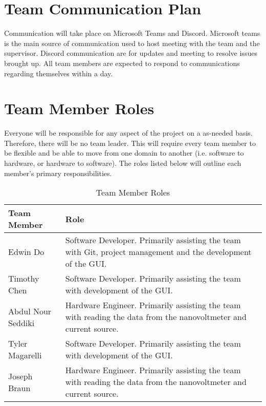 \documentclass{article}
\begin{document}
\section{Team Communication Plan}
Communication will take place on Microsoft Teams and Discord. 
Microsoft teams is the main source of communication used to host meeting with the team and the supervisor. 
Discord communication are for updates and meeting to resolve issues brought up. 
All team members are expected to respond to communications regarding themselves within a day.

\section{Team Member Roles}
\indent Everyone will be responsible for any aspect of the project on a as-needed basis. Therefore, there will be no team leader.
This will require every team member to be flexible and be able to move from one domain to another (i.e. software to hardware, or hardware to software).
The roles listed below will outline each member's primary responsibilities.
\begin{table}[h!]
    \centering

	
    \begin{tabular}{p{} p{}}

    \toprule
    \textbf{Team Member} & \textbf{Role}\\

    \midrule{Edwin Do} & Software Developer. Primarily assisting the team with Git, project management and the development of the GUI. \\
    \midrule{Timothy Chen} & Software Developer. Primarily assisting the team with development of the GUI. \\
    \midrule{Abdul Nour Seddiki} & Hardware Engineer. Primarily assisting the team with reading the data from the nanovoltmeter and current source. \\
    \midrule{Tyler Magarelli} & Software Developer. Primarily assisting the team with development of the GUI. \\
    \midrule{Joseph Braun} & Hardware Engineer. Primarily assisting the team with reading the data from the nanovoltmeter and current source.  \\

    \bottomrule

    \end{tabular}
    \caption{Team Member Roles}
\end{table}
\end{document}
